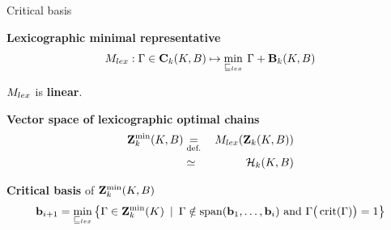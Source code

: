 \begin{frame}{Critical basis}
	\small
	
	\textbf{Lexicographic minimal representative}
	\[
		M_{lex} : \Gamma \in \mathbf{C}_k(K, B) \mapsto \min_{\sqsubseteq_{lex}} \: \Gamma + \mathbf{B}_{k}(K, B)
	\]
	
	$M_{lex}$ is \textbf{linear}.
	
	\textbf{Vector space of lexicographic optimal chains}
	\begin{eqnarray*}
		\mathbf{Z}^{\min}_k(K,B) &\underset{\text{def.}}{=} \:& M_{lex}(\mathbf{Z}_k(K, B)) \\
						  &\simeq& \mathcal{H}_k(K, B)
	\end{eqnarray*}
	
	\textbf{Critical basis} of $\mathbf{Z}^{\min}_k(K,B)$
	\begin{equation*}
		\mathbf{b}_{i+1} = \min_{\sqsubseteq_{lex}} \left\{  \Gamma \in  \mathbf{Z}^{\min}_k(K) \: \mid \:   \Gamma \notin \operatorname{span}(  \mathbf{b}_1, \ldots , \mathbf{b}_i ) \text{ and } \Gamma\big(\operatorname{crit}(\Gamma)\big)= 1 \right\}
	\end{equation*}
\end{frame}

%	
%		
%


